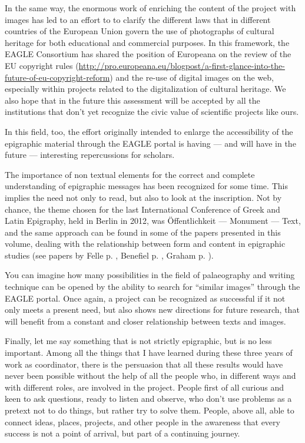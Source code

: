 In the same way, the enormous work of enriching the content of the project with images has led to an effort to to clarify the different laws that in different countries of the European Union govern the use of photographs of cultural heritage for both educational and commercial purposes. In this framework, the EAGLE Consortium has shared the position of Europeana on the review of the EU copyright rules (\url{http://pro.europeana.eu/blogpost/a-first-glance-into-the-future-of-eu-copyright-reform}) and the re-use of digital images on the web, especially within projects related to the digitalization of cultural heritage. We also hope that in the future this assessment will be accepted by all the institutions that don’t yet recognize the civic value of scientific projects like ours.

In this field, too, the effort originally intended to enlarge the accessibility of the epigraphic material through the EAGLE portal is having --- and will have in the future --- interesting repercussions for scholars.

The importance of non textual elements for the correct and complete understanding of epigraphic messages has been recognized for some time. This implies the need not only to read, but also to look at the inscription. Not by chance, the theme chosen for the last International Conference of Greek and Latin Epigraphy, held in Berlin in 2012, was Öffentlichkeit --- Monument --- Text, and the same approach can be found in some of the papers presented in this volume, dealing with the relationship between form and content in epigraphic studies (see papers by Felle p. \pageref{p40}, Benefiel p. \pageref{p43}, Graham p. \pageref{p10}).


You can imagine how many possibilities in the field of palaeography and writing technique can be opened by the ability to search for ``similar images'' through the EAGLE portal. Once again, a project can be recognized as successful if it not only meets a present need, but also shows new directions for future research, that will benefit from a constant and closer relationship between texts and images.

Finally, let me say something that is not strictly epigraphic, but is no less important. Among all the things that I have learned during these three years of work as coordinator, there is the persuasion that all these results would have never been possible without the help of all the people who, in different ways and with different roles, are involved in the project. People first of all curious and keen to ask questions, ready to listen and observe, who don’t use problems as a pretext not to do things, but rather try to solve them. People, above all, able to connect ideas, places, projects, and other people in the awareness that every success is not a point of arrival, but part of a continuing journey.

